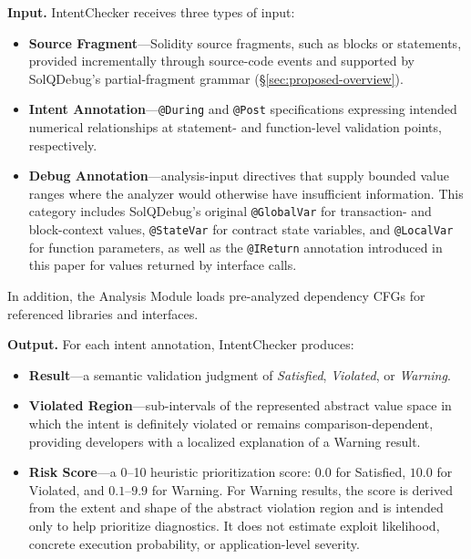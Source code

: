 \documentclass[pdflatex,sn-basic]{sn-jnl}%
\theoremstyle{thmstyleone}%
\theoremstyle{thmstyletwo}%
\theoremstyle{thmstylethree}%
\begin{document}
\smallskip
\noindent\textbf{Input.}
IntentChecker receives three types of input:
\begin{itemize}
    \item \textbf{Source Fragment}---Solidity source fragments, such as blocks
    or statements, provided incrementally through source-code events and
    supported by SolQDebug's partial-fragment grammar
    (\S\ref{sec:proposed-overview}).

    \item \textbf{Intent Annotation}---\texttt{@During} and \texttt{@Post}
    specifications expressing intended numerical relationships at statement-
    and function-level validation points, respectively.

    \item \textbf{Debug Annotation}---analysis-input directives that supply
    bounded value ranges where the analyzer would otherwise have insufficient
    information. This category includes SolQDebug's original
    \texttt{@GlobalVar} for transaction- and block-context values,
    \texttt{@StateVar} for contract state variables, and
    \texttt{@LocalVar} for function parameters, as well as the
    \texttt{@IReturn} annotation introduced in this paper for values returned
    by interface calls.
\end{itemize}

In addition, the Analysis Module loads pre-analyzed dependency CFGs for
referenced libraries and interfaces.

\smallskip
\noindent\textbf{Output.}
For each intent annotation, IntentChecker produces:
\begin{itemize}
    \item \textbf{Result}---a semantic validation judgment of
    \emph{Satisfied}, \emph{Violated}, or \emph{Warning}.

    \item \textbf{Violated Region}---sub-intervals of the represented abstract
    value space in which the intent is definitely violated or remains
    comparison-dependent, providing developers with a localized explanation of
    a Warning result.

    \item \textbf{Risk Score}---a 0--10 heuristic prioritization score:
    $0.0$ for Satisfied, $10.0$ for Violated, and $0.1$--$9.9$ for Warning.
    For Warning results, the score is derived from the extent and shape of the
    abstract violation region and is intended only to help prioritize
    diagnostics. It does not estimate exploit likelihood, concrete execution
    probability, or application-level severity.
\end{itemize}
\end{document}
